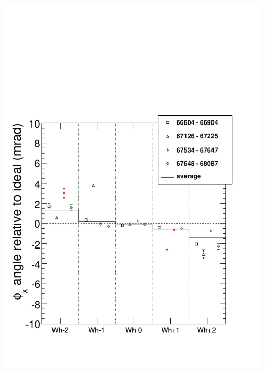 \documentclass[compress]{beamer}
\begin{document}
\begin{frame}
{\begin{columns}
\includegraphics[width=\linewidth]{bydataset_MP_phix.pdf}

\end{columns}}
\end{frame}
\end{document}
